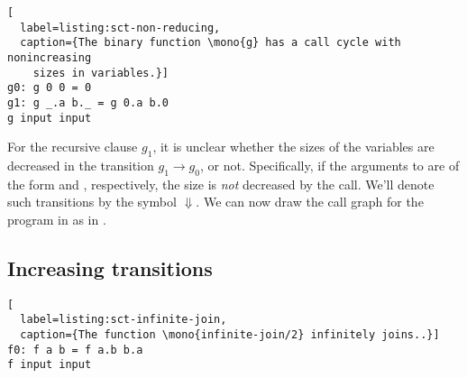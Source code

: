 \begin{lstlisting}[
  label=listing:sct-non-reducing,
  caption={The binary function \mono{g} has a call cycle with nonincreasing
    sizes in variables.}]
g0: g 0 0 = 0
g1: g _.a b._ = g 0.a b.0
g input input
\end{lstlisting}


For the recursive clause $g_1$, it is unclear whether the sizes of the
variables are decreased in the transition $g_1\rightarrow g_0$, or not.
Specifically, if the arguments to  are of the form  and
, respectively, the size is \emph{not} decreased by the call. We'll
denote such transitions by the symbol $\Downarrow$. We can now draw the call
graph for the program in  as in
.



\subsection{Increasing transitions}




\begin{lstlisting}[
  label=listing:sct-infinite-join,
  caption={The function \mono{infinite-join/2} infinitely joins..}]
f0: f a b = f a.b b.a
f input input
\end{lstlisting}





